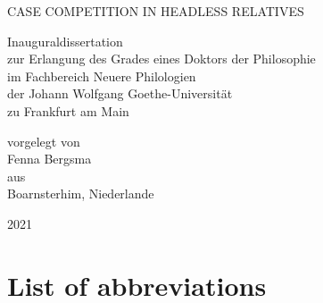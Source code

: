 \documentclass[hidelinks,a4paper,oneside]{memoir}
\begin{document}

\frontmatter

\begin{titlingpage}

\center
\Large

CASE COMPETITION IN HEADLESS RELATIVES\\

\vspace{4em}

Inauguraldissertation\\
\vspace{1em}
zur Erlangung des Grades eines Doktors der Philosophie\\
\vspace{1em}
im Fachbereich Neuere Philologien\\
\vspace{1em}
der Johann Wolfgang Goethe-Universität\\
\vspace{1em}
zu Frankfurt am Main\\

\vspace{5em}

vorgelegt von\\
\vspace{1em}
Fenna Bergsma\\
\vspace{1em}
aus\\
\vspace{1em}
Boarnsterhim, Niederlande\\

\vspace{3em}

2021

\end{titlingpage}

\clearpage

% 

\clearpage
\tableofcontents

\clearpage
\listoftables

\clearpage
\listoffigures

\chapter*[List of abbreviations]{List of abbreviations}
\begingroup
  \setlength{\LTleft}{-\tabcolsep}
\printacronyms[include=abbr, heading=none]
\endgroup
{}
\end{document}

